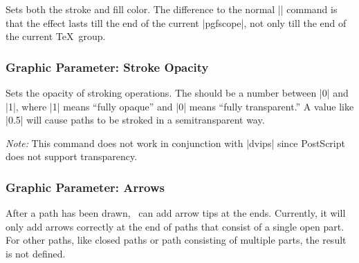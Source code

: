 \begin{command}{\pgfsetcolor{}}
  Sets both the stroke and fill color. The difference to the normal
  |\color| command is that the effect lasts till the end of the
  current |{pgfscope}|, not only till the end of the current \TeX\
  group. 
\end{command}


\subsubsection{Graphic Parameter: Stroke Opacity}

\begin{command}{\pgfsetstrokeopacity{}}
  Sets the opacity of stroking operations. The  should be
  a number between |0| and |1|, where |1| means ``fully opaque'' and
  |0| means ``fully transparent.'' A value like |0.5| will cause paths
  to be stroked in a semitransparent way.

  \emph{Note:} This command does not work in conjunction with |dvips|
  since PostScript does not support transparency.
  
\begin{codeexample}[]
\begin{pgfpicture}
  \pgfsetlinewidth{5mm}
  \color{red}
  \pgfpathcircle{\pgfpoint{0cm}{0cm}}{10mm} 
  \color{black}
  \pgfpathcircle{\pgfpoint{1cm}{0cm}}{10mm} 
\end{pgfpicture}
\end{codeexample}
\end{command}


\subsubsection{Graphic Parameter: Arrows}

After a path has been drawn, \pgfname\ can add arrow tips at the
ends. Currently, it will only add arrows correctly at the end of paths
that consist of a single open part. For other paths, like closed paths
or path consisting of multiple parts, the result is not defined.

